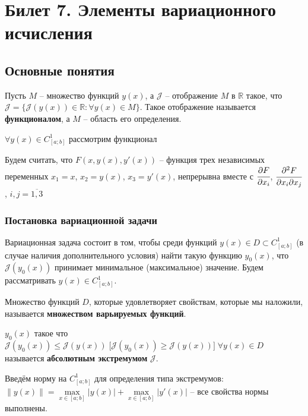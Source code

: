 \section{Билет 7. Элементы вариационного исчисления}
\subsection{Основные понятия}
\begin{definition}
	Пусть $M$ -- множество функций $y(x)$, а $\mathcal{J}$ -- отображение $M$ в $\mathbb{R}$ такое, что $\mathcal{J} = \{ \mathcal{J}(y(x)) \in \mathbb{R}: \forall y(x) \in M \}$. 
	Такое отображение называется \textbf{функционалом}, а $M$ -- область его определения. 
\end{definition}

$\forall y(x) \in C^1_{[a;b]}$ рассмотрим функционал 

Будем считать, что $F(x, y(x), y'(x))$ -- функция трех независимых переменных $x_1 = x$, $x_2 = y(x)$, $x_3 = y'(x)$, непрерывна вместе с $\cfrac{\partial{F}}{\partial{x_i}}$,  $\cfrac{\partial^2{F}}{\partial{x_i}\partial{x_j}}$, $i,j = \overline{1, 3}$ 

\subsubsection*{Постановка вариационной задачи}

Вариационная задача состоит в том, чтобы среди функций $y(x) \in D \subset C^1_{[a;b]}$ (в случае наличия дополнительного условия) найти такую функцию $y_0(x)$, что $\mathcal{J}(y_0(x))$ принимает минимальное (максимальное) значение. Будем рассматривать $y(x) \in C^1_{[a;b]}$.

\begin{definition}
	Множество функций $D$, которые удовлетворяет свойствам, которые мы наложили, называется \textbf{множеством варьируемых функций}.
\end{definition}

\begin{definition}
	$y_0(x)$ такое что $\mathcal{J}(y_0(x)) \leqslant \mathcal{J}(y(x)) \; \big[\mathcal{J}(y_0(x)) \geqslant \mathcal{J}(y(x))\big] \; \forall y(x) \in D$ называется \textbf{абсолютным экстремумом} $\mathcal{J}$.  
\end{definition}

Введём норму на $C^1_{[a;b]}$ для определения типа экстремумов: $\| y(x) \| = \max \limits_{x \in [a;b]} |y(x)| + \max \limits_{x \in [a;b]} |y'(x)|$ -- все свойства нормы выполнены.

